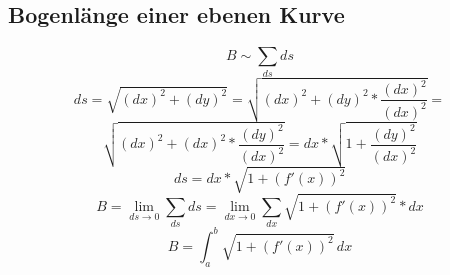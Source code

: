 \documentclass[11pt]{amsart}
\theoremstyle{remark}
\begin{document}
\subsection{Bogenl\"ange einer ebenen Kurve}
\begin{equation*}
	B \sim \sum_{ds} ds
\end{equation*}
\begin{equation*}
	ds = \sqrt{(dx)^2 + (dy)^2} = \sqrt{(dx)^2 + (dy)^2 * \frac{(dx)^2}{(dx)^2}} = 
\end{equation*}
\begin{equation*}
	\sqrt{(dx)^2 + (dx)^2 * \frac{(dy)^2}{(dx)^2}} = dx* \sqrt{ 1 +  \frac{(dy)^2}{(dx)^2}}
\end{equation*}
\begin{equation*}
	ds = dx* \sqrt{ 1 +  (f'(x))^2}
\end{equation*}
\newline
\begin{equation*}
	B = \lim_{ds \to 0} \sum_{ds} ds = \lim_{dx \to 0} \sum_{dx} \sqrt { 1 +  (f'(x))^2} *dx
\end{equation*}
\begin{equation*}
	B = \int_a^b \sqrt { 1 +  (f'(x))^2} \,dx
\end{equation*}
\end{document}
